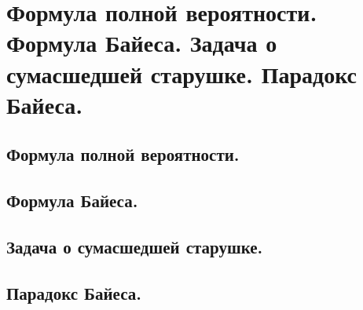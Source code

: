 \section{Формула полной вероятности. Формула Байеса. Задача о сумасшедшей старушке. Парадокс Байеса.}

\subsection{Формула полной вероятности.}

\subsection{Формула Байеса.}

\subsection{Задача о сумасшедшей старушке.}

\subsection{Парадокс Байеса.}
